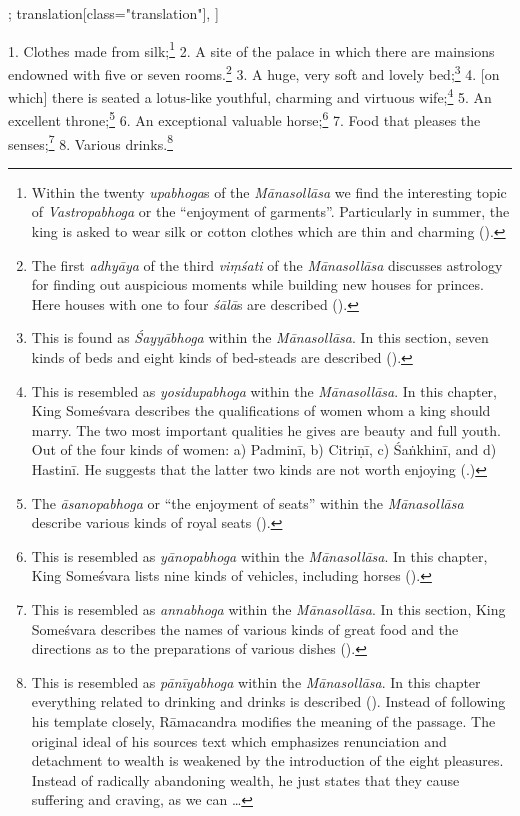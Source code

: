 \begin{alignment}[
  texts=edition[class="edition"];
  translation[class="translation"],
  ]
\begin{translation}
\begin{tlate}
  1. Clothes made from silk;\footnote{Within the twenty \textit{upabhoga}s of the \textit{Mānasollāsa} we find the interesting topic of \textit{Vastropabhoga} or the ``enjoyment of garments''. Particularly in summer, the king is asked to wear silk or cotton clothes which are thin and charming (\citeauthor[1939:14]{manasollasa}).} 2. A site of the palace in which there are mainsions endowned with five or seven rooms.\footnote{The first \textit{adhyāya} of the third \textit{viṃśati} of the \textit{Mānasollāsa} discusses astrology for finding out auspicious moments while building new houses for princes. Here houses with one to four \textit{śālā}s are described (\citeauthor[1939:6-7]{manasollasa}).} 3. A huge, very soft and lovely bed;\footnote{This is found as \textit{Śayyābhoga} within the \textit{Mānasollāsa}. In this section, seven kinds of beds and eight kinds of bed-steads are described (\citeauthor[1939:21]{manasollasa}).} 4. [on which] there is seated a lotus-like youthful, charming and virtuous wife;\footnote{This is resembled as \textit{yosidupabhoga} within the \textit{Mānasollāsa}. In this chapter, King Someśvara describes the qualifications of women whom a king should marry. The two most important qualities he gives are beauty and full youth. Out of the four kinds of women: a) Padminī, b) Citriṇī, c) Śaṅkhinī, and d) Hastinī. He suggests that the latter two kinds are not worth enjoying  (\citeauthor[21]{manasollasa}.)} 5. An excellent throne;\footnote{The \textit{āsanopabhoga} or ``the enjoyment of seats'' within the \textit{Mānasollāsa} describe various kinds of royal seats (\citeauthor[1939:15]{manasollasa}).} 6. An exceptional valuable horse;\footnote{This is resembled as \textit{yānopabhoga} within the \textit{Mānasollāsa}. In this chapter, King Someśvara lists nine kinds of vehicles, including horses (\citeauthor[1939:24]{manasollasa}).} 7. Food that pleases the senses;\footnote{This is resembled as \textit{annabhoga} within the \textit{Mānasollāsa}. In this section, King Someśvara describes the names of various kinds of great food and the directions as to the preparations of various dishes (\citeauthor[1939:21]{manasollasa}).} 8. Various drinks.\footnote{This is resembled as \textit{pānīyabhoga} within the \textit{Mānasollāsa}. In this chapter everything related to drinking and drinks is described (\citeauthor[1939:23]{manasollasa}). Instead of following his template closely, Rāmacandra modifies the meaning of the passage. The original ideal of his sources text which emphasizes renunciation and detachment to wealth is weakened by the introduction of the eight pleasures. Instead of radically abandoning wealth, he just states that they cause suffering and craving, as we can \ldots}\hfill \break 

\end{tlate}
\end{translation}
\end{alignment}
